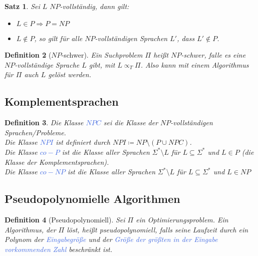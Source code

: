 \documentclass[11pt]{scrartcl}
\newcommand{\tcol}[1]{\textcolor{RoyalBlue}{#1}}
\theoremstyle{break}
\newtheorem{satz}{Satz}[section]
\newtheorem{defi}[satz]{Definition}
\begin{document}
    \begin{satz}
        Sei $L$ $NP$-vollständig, dann gilt:
        \begin{itemize}
            \item $L\in P\Rightarrow P=NP$
            \item $L\notin P$, so gilt für alle $NP$-vollständigen Sprachen $L'$, dass $L'\notin P$.
        \end{itemize}
    \end{satz}


    \begin{defi}[$NP$-schwer]
        Ein Suchproblem $\Pi$ heißt $NP$-schwer, falle es eine $NP$-vollständige Sprache $L$ gibt, mit $L\propto_T\Pi$.
        Also kann mit einem Algorithmus für $\Pi$ auch $L$ gelöst werden.
    \end{defi}


    \subsection{Komplementsprachen}
	\label{subsec:komplementsprachen}

    \begin{defi}
        Die Klasse \tcol{$NPC$} sei die Klasse der $NP$-vollständigen Sprachen/Probleme.\\
        Die Klasse \tcol{$NPI$} ist definiert durch $NPI\coloneqq NP\setminus(P\cup NPC)$.\\
        Die Klasse \tcol{$co-P$} ist die Klasse aller Sprachen $\Sigma^*\setminus L$ für $L\subseteq\Sigma^*$ und $L\in P$ (die Klasse der Komplementsprachen).\\
        Die Klasse \tcol{$co-NP$} ist die Klasse aller Sprachen $\Sigma^*\setminus L$ für $L\subseteq\Sigma^*$ und $L\in NP$
    \end{defi}


    \subsection{Pseudopolynomielle Algorithmen
	}\label{subsec:pseudopolynomielle-algorithmen}

    \begin{defi}[Pseudopolynomiell]
        Sei $\Pi$ ein Optimierungsproblem.
        Ein Algorithmus, der $\Pi$ löst, heißt pseudopolynomiell, falls seine Laufzeit durch ein Polynom der \tcol{Eingabegröße} und der \tcol{Größe der größten in der Eingabe vorkommenden Zahl} beschränkt ist.
    \end{defi}
\end{document}
